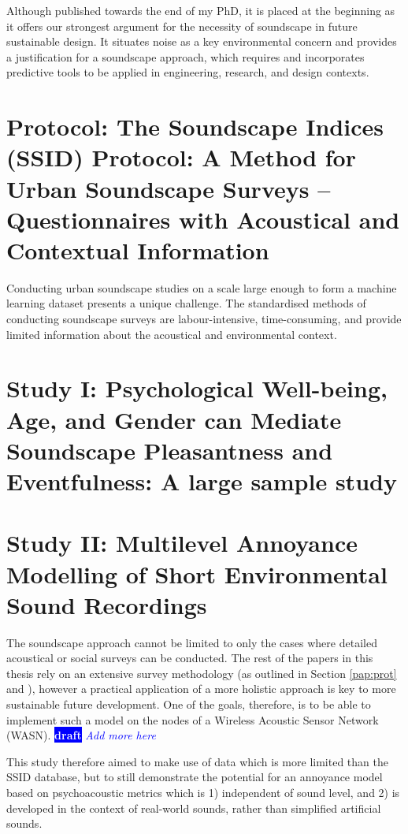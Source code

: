 \documentclass[twoside,fontsize=12pt,titlepage]{scrbook}
\newcommand{\remark}[3]{%
    {\colorbox{#2}{\sffamily\scriptsize\bfseries\textcolor{white}{#1}}}
    {\sffamily\small\itshape\textcolor{#2}{#3}}
}
\newcommand{\draft}[1]{\remark{draft}{blue}{#1}}
\begin{document}
 Although published towards the end of my PhD, it is placed at the beginning as it offers our strongest argument for the necessity of soundscape in future sustainable design. It situates noise as a key environmental concern and provides a justification for a soundscape approach, which requires and incorporates predictive tools to be applied in engineering, research, and design contexts.

 \newpage
\section[Protocol]{\label{pap:prot}Protocol: The Soundscape Indices (SSID) Protocol: A Method for Urban Soundscape Surveys -- Questionnaires with Acoustical and Contextual Information}

 Conducting urban soundscape studies on a scale large enough to form a machine learning dataset presents a unique challenge. The standardised methods of conducting soundscape surveys \citep{ISO12913_2_2018IOS} are labour-intensive, time-consuming, and provide limited information about the acoustical and environmental context.

 

\section[Study I]{Study I: Psychological Well-being, Age, and Gender can Mediate Soundscape Pleasantness and Eventfulness: A large sample study}

 

\section[Study II]{Study II: Multilevel Annoyance Modelling of Short Environmental Sound Recordings}
The soundscape approach cannot be limited to only the cases where detailed acoustical or social surveys can be conducted. The rest of the papers in this thesis rely on an extensive survey methodology (as outlined in Section \ref{pap:prot} and \citep{Mitchell2020Soundscape}), however a practical application of a more holistic approach is key to more sustainable future development. One of the goals, therefore, is to be able to implement such a model on the nodes of a Wireless Acoustic Sensor Network (WASN). \draft{Add more here}

This study therefore aimed to make use of data which is more limited than the SSID database, but to still demonstrate the potential for an annoyance model based on psychoacoustic metrics which is 1) independent of sound level, and 2) is developed in the context of real-world sounds, rather than simplified artificial sounds.
\end{document}
